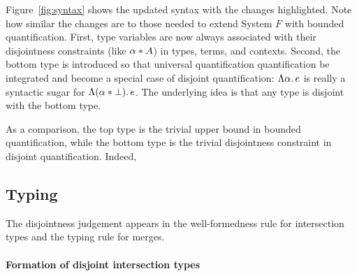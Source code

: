Figure~\ref{fig:syntax} shows the updated syntax with the changes highlighted.
Note how similar the changes are to those needed to extend System $F$ with
bounded quantification. First, type variables are now always associated with
their disjointness constraints (like $\alpha * A$) in types, terms, and
contexts. Second, the bottom type is introduced so that universal quantification
quantification be integrated and become a special case of disjoint
quantification: $\Lambda \alpha.\, e$ is really a syntactic sugar for $\Lambda (\alpha * \bot).\, e$. The underlying idea is that any type is disjoint
with the bottom type.

As a comparison, the top type is the trivial upper bound in bounded
quantification, while the bottom type is the trivial disjointness constraint in
disjoint quantification. Indeed, 

\subsection{Typing}

The disjointness judgement appears in the well-formedness rule for intersection
types and the typing rule for merges.

\paragraph{Formation of disjoint intersection types}

